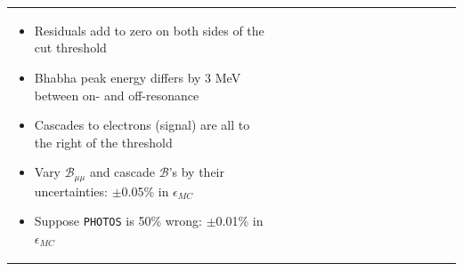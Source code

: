 \documentclass[landscape]{article}
\begin{document}
\begin{tabular}{p{0.6\linewidth} p{0.4\linewidth}}
\begin{minipage}{1.1\linewidth}
    \begin{itemize}

      \item Residuals add to zero on both sides of the cut threshold

\vspace{1 cm}
      \item Bhabha peak energy differs by 3 MeV between on- and off-resonance

\vspace{1 cm}
      \item Cascades to electrons (signal) are all to the right of the threshold

\vspace{1 cm}
      \item Vary $\mathcal{B}_{\mu\mu}$ and cascade $\mathcal{B}$'s by
      their uncertainties: $\pm$0.05\% in $\epsilon_{MC}$

\vspace{1 cm}
      \item Suppose {\tt PHOTOS} is 50\% wrong: $\pm$0.01\% in $\epsilon_{MC}$

    \end{itemize}

  \end{minipage} \\
\end{tabular}
\end{document}
